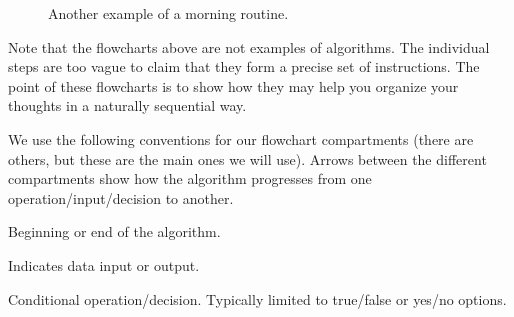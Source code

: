 \documentclass{ximera}
\begin{document}
\begin{figure}
\centering
	\caption{Another example of a morning routine.}\label{fig:slowmorning}
\end{figure}

Note that the flowcharts above are not examples of algorithms. The individual steps are too vague to claim that they form a precise set of instructions. The point of these flowcharts is to show how they may help you organize your thoughts in a naturally sequential way.

We use the following conventions for our flowchart compartments (there are others, but these are the main ones we will use). Arrows between the different compartments show how the algorithm progresses from one operation/input/decision to another.

\begin{center}
\end{center}
\begin{center}
	Beginning or end of the algorithm.
\end{center}

\begin{center}
\end{center}
\begin{center}
	Indicates data input or output.
\end{center}

\begin{center}
\end{center}
\begin{center}
	Conditional operation/decision. Typically limited to true/false or yes/no options.
\end{center}
\end{document}
